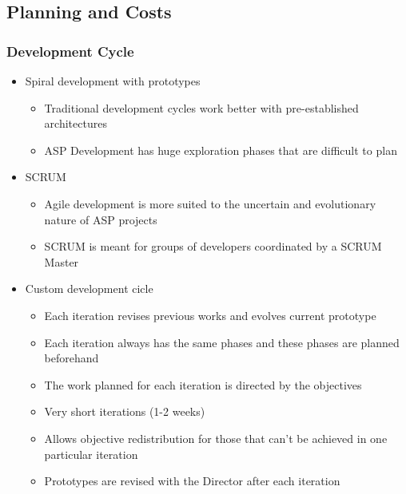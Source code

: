 \documentclass[english]{beamer}
\begin{document}
\subsection{Planning and Costs}
	\begin{frame}
		\frametitle{Development Cycle}
		\begin{itemize}
			\item Spiral development with prototypes
				\begin{itemize}
					 \item<pro@1-> Traditional development cycles work better with pre-established architectures
					 \item<con@1-> ASP Development has huge exploration phases that are difficult to plan
				\end{itemize}
			\item SCRUM
				\begin{itemize}
					 \item<pro@1-> Agile development is more suited to the uncertain and evolutionary nature of ASP projects
					 \item<con@1-> SCRUM is meant for groups of developers coordinated by a SCRUM Master
				\end{itemize}
			\item Custom development cicle
				\begin{itemize}
					 \item Each iteration revises previous works and evolves current prototype
					 \item Each iteration always has the same phases and these phases are planned beforehand
					 \item The work planned for each iteration is directed by the objectives
					 \item Very short iterations (1-2 weeks)
					 \item Allows objective redistribution for those that can't be achieved in one particular iteration
					 \item Prototypes are revised with the Director after each iteration
				\end{itemize}
		\end{itemize}
	\end{frame}
\end{document}
